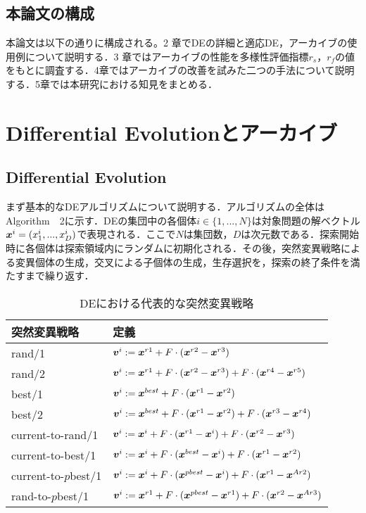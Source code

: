 \documentclass[a4paper,11pt,oneside,openany]{jsbook}
\def\vector#1{\mbox{\boldmath $#1$}}
\begin{document}
\section{本論文の構成}
本論文は以下の通りに構成される。2 章でDEの詳細と適応DE，アーカイブの使用例について説明する．3 章ではアーカイブの性能を多様性評価指標$r_s$，$r_f$の値をもとに調査する．4章ではアーカイブの改善を試みた二つの手法について説明する．5章では本研究における知見をまとめる．

\chapter{Differential Evolutionとアーカイブ}
\section{Differential Evolution}
まず基本的なDEアルゴリズムについて説明する．アルゴリズムの全体はAlgorithm　2に示す．DEの集団中の各個体$i \in \{1, ..., N\}$は対象問題の解ベクトル$\vector{x}^i = (x^i_1, ..., x^i_D)$で表現される．ここで$N$は集団数，$D$は次元数である．探索開始時に各個体は探索領域内にランダムに初期化される．その後，突然変異戦略による変異個体の生成，交叉による子個体の生成，生存選択を，探索の終了条件を満たすまで繰り返す．

\begin{table}[h]
  \begin{center}
  \caption{DEにおける代表的な突然変異戦略}
    \begin{tabular}{ll} \hline
      突然変異戦略　& 定義  \\ \hline
      rand/1 & $\vector{v}^{i} := \vector{x}^{r1} + F\cdot(\vector{x}^{r2} - \vector{x}^{r3})$ \\
      rand/2 & $\vector{v}^{i} := \vector{x}^{r1} + F\cdot(\vector{x}^{r2} - \vector{x}^{r3}) + F\cdot(\vector{x}^{r4} - \vector{x}^{r5})$ \\
      best/1 & $\vector{v}^{i} := \vector{x}^{best} + F\cdot(\vector{x}^{r1} - \vector{x}^{r2})$ \\
      best/2 & $\vector{v}^{i} := \vector{x}^{best} + F\cdot(\vector{x}^{r1} - \vector{x}^{r2}) + F\cdot(\vector{x}^{r3} - \vector{x}^{r4})$ \\
      current-to-rand/1 & $\vector{v}^{i} := \vector{x}^{i} + F\cdot(\vector{x}^{r1} - \vector{x}^{i}) + F\cdot(\vector{x}^{r2} - \vector{x}^{r3})$ \\
      current-to-best/1 & $\vector{v}^{i} := \vector{x}^{i} + F\cdot(\vector{x}^{best} - \vector{x}^{i}) + F\cdot(\vector{x}^{r1} - \vector{x}^{r2})$ \\
      current-to-$p$best/1 & $\vector{v}^{i} := \vector{x}^{i} + F\cdot(\vector{x}^{pbest} - \vector{x}^{i}) + F\cdot(\vector{x}^{r1} - \vector{x}^{Ar2})$ \\
      rand-to-$p$best/1 & $\vector{v}^{i} := \vector{x}^{r1} + F\cdot(\vector{x}^{pbest} - \vector{x}^{r1}) + F\cdot(\vector{x}^{r2} - \vector{x}^{Ar3})$ \\ \hline
    \end{tabular}
  \end{center}
\end{table}
\end{document}
